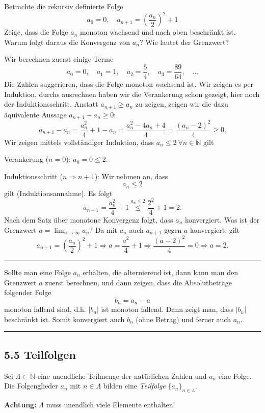 \documentclass[a4paper,landscape,8pt]{extarticle}
\newcommand{\N}{\mathbb{N}}
\newcommand{\abs}[1]{\left\lvert #1 \right\rvert}
\newcommand{\sep}{\vspace{5pt}\noindent\hrule\vspace{5pt}}
\newcommand{\Achtung}{\textbf{Achtung: }}
\begin{document}
\begin{multicols*}{4}
\begin{warmup}
\Bsp Betrachte die rekursiv definierte Folge
\[
a_0 = 0, \quad a_{n+1} = \left(\frac{a_n}{2}\right)^2+1
\]
Zeige, dass die Folge $a_n$ monoton wachsend und nach oben beschränkt ist. Warum
folgt daraus die Konvergenz von $a_n$? Wie lautet der Grenzwert?

Wir berechnen zuerst einige Terme
\[
a_0 = 0, \quad a_1 = 1, \quad a_2 = \frac{5}{4}, \quad a_3 = \frac{89}{64},
\quad \ldots
\]
Die Zahlen suggerieren, dass die Folge monoton wachsend ist. Wir zeigen es per
Induktion, durchs ausrechnen haben wir die Verankerung schon gezeigt, hier noch
der Induktionsschritt. Anstatt $a_{n+1}\geq a_n$ zu zeigen, zeigen wir die dazu
äquivalente Aussage $a_{n+1}-a_n\geq 0$:
\[
a_{n+1} - a_n = \frac{a_n^2}{4} +1 -a_n = \frac{a_n^2-4a_n+4}{4} =
\frac{(a_n-2)^2}{4}\geq 0.
\]
Wir zeigen mittels vollständiger Induktion, dass $a_n\leq 2 \ \forall n\in\N$
gilt

Verankerung ($n=0$): $a_0 = 0 \leq 2$.

Induktionsschritt ($n\Longrightarrow n+1$): Wir nehmen an, dass
\[
a_n\leq 2
\]
gilt (Induktionsannahme). Es folgt
\[
a_{n+1}=\frac{a_n^2}{4}+1 \stackrel{a_n\leq 2}{\leq} \frac{2^2}{4} + 1 = 2.
\]
Nach dem Satz über monotone Konvergenz folgt, dass $a_n$ konvergiert. Was ist
der Grenzwert $a=\lim_{n\to\infty} a_n$? Da mit $a_n$ auch $a_{n+1}$ gegen $a$
konvergiert, gilt
\[
a_{n+1} =\left(\frac{a_n}{2}\right)^2 +
1
\Rightarrow a = \frac{a^2}{4} + 1
\Rightarrow \frac{(a-2)^2}{4} = 0
\Rightarrow a = 2.
\]

\sep
\end{warmup}

\Trick Sollte man eine Folge $a_n$ erhalten, die alternierend ist, dann kann man
den Grenzwert $a$ zuerst berechnen, und dann zeigen, dass die Absolutbeträge
folgender Folge
\[
b_n = a_n - a
\]
monoton fallend sind, d.h. $\abs{b_n}$ ist monoton fallend. Dann zeigt man, dass
$\abs{b_n}$ beschränkt ist. Somit konvergiert auch $b_n$ (ohne Betrag) und
ferner auch $a_n$.


\sep


\subsection{5.5 Teilfolgen}

\Def Sei $\Lambda \subset \N $ eine unendliche Teilmenge der natürlichen Zahlen
und $a_n$ eine Folge. Die Folgenglieder $a_n$ mit $n\in \Lambda$ bilden eine
\emph{Teilfolge} $\{a_n\}_{n\in\Lambda}$.

\Achtung $\Lambda$ muss unendlich viele Elemente enthalten!


\end{multicols*}
\end{document}
